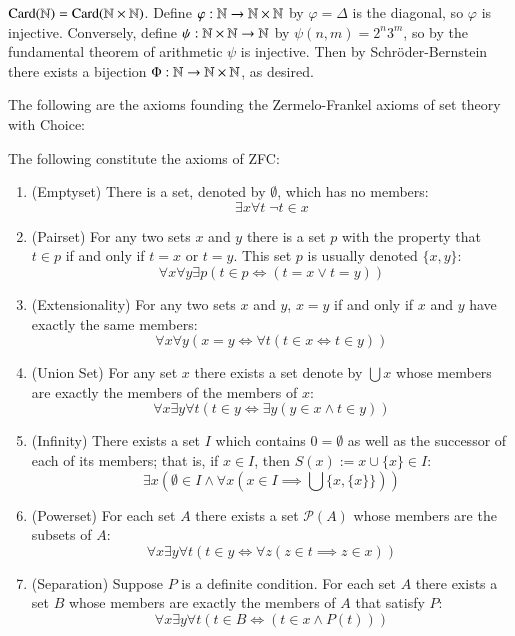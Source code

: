 \begin{example}
    $\text{Card}(\mathbb N) = \text{Card}(\mathbb N\times \mathbb N)$. Define $\varphi:\mathbb N\rightarrow \mathbb N\times \mathbb N$ by $\varphi = \Delta$ is the diagonal, so $\varphi$ is injective. Conversely, define $\psi:\mathbb N\times\mathbb N\rightarrow \mathbb N$ by $\psi(n,m) = 2^n3^m$, so by the fundamental theorem of arithmetic $\psi$ is injective. Then by Schr\"{o}der-Bernstein there exists a bijection $\Phi:\mathbb N\rightarrow \mathbb N\times \mathbb N$, as desired.
\end{example}

The following are the axioms founding the Zermelo-Frankel axioms of set theory with Choice:

\begin{axiom}
    The following constitute the axioms of ZFC: \begin{enumerate}
        \item (Emptyset) There is a set, denoted by $\emptyset$, which has no members: $$\exists x\forall t\;\lnot t \in x$$
        \item (Pairset) For any two sets $x$ and $y$ there is a set $p$ with the property that $t \in p$ if and only if $t = x$ or $t = y$. This set $p$ is usually denoted $\{x,y\}$: $$\forall x\forall y\exists p(t \in p \iff (t = x\lor t = y))$$
        \item (Extensionality) For any two sets $x$ and $y$, $x = y$ if and only if $x$ and $y$ have exactly the same members: $$\forall x\forall y(x = y \iff \forall t(t \in x \iff t \in y))$$
        \item (Union Set) For any set $x$ there exists a set denote by $\bigcup x$ whose members are exactly the members of the members of $x$: $$\forall x \exists y\forall t(t \in y \iff \exists y(y \in x \land t \in y))$$
        \item (Infinity) There exists a set $I$ which contains $0 = \emptyset$ as well as the successor of each of its members; that is, if $x \in I$, then $S(x) := x \cup \{x\} \in I$: $$\exists x(\emptyset \in I \land \forall x(x \in I \implies \bigcup\{x,\{x\}\}))$$
        \item (Powerset) For each set $A$ there exists a set $\mathcal{P}(A)$ whose members are the subsets of $A$: $$\forall x \exists y\forall t(t \in y \iff \forall z(z \in t \implies z \in x))$$
        \item (Separation) Suppose $P$ is a definite condition. For each set $A$ there exists a set $B$ whose members are exactly the members of $A$ that satisfy $P$: $$\forall x \exists y \forall t(t \in B \iff (t \in x \land P(t)))$$

\end{enumerate}
\end{axiom}

